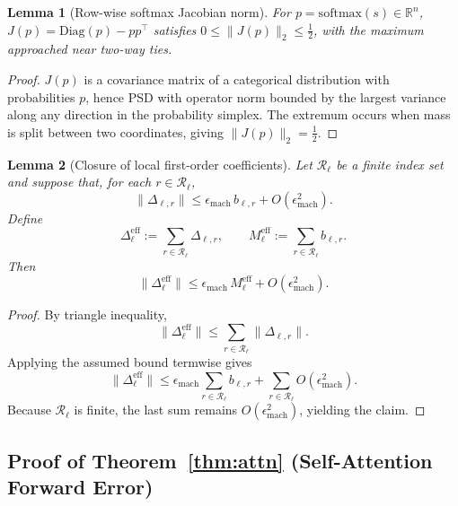 \documentclass[twoside]{article}
\newtheorem{lemma}{Lemma}
\theoremstyle{definition}
\theoremstyle{remark}
\begin{document}
\begin{lemma}[Row-wise softmax Jacobian norm]
\label{lem:softmax-jac}
For $p=\mathrm{softmax}(s)\in\mathbb{R}^n$, $J(p)=\mathrm{Diag}(p)-pp^\top$ satisfies $0\le \|J(p)\|_2\le\tfrac12$, with the maximum approached near two-way ties.
\end{lemma}

\begin{proof}
$J(p)$ is a covariance matrix of a categorical distribution with probabilities $p$, hence PSD with operator norm bounded by the largest variance along any direction in the probability simplex. The extremum occurs when mass is split between two coordinates, giving $\|J(p)\|_2=\tfrac12$.
\end{proof}

\begin{lemma}[Closure of local first-order coefficients]
\label{lem:eff-closure}
Let $\mathcal{R}_\ell$ be a finite index set and suppose that, for each
$r\in\mathcal{R}_\ell$,
\[
\|\Delta_{\ell,r}\|
\le
\epsilon_{\mathrm{mach}}\,b_{\ell,r}
+ O(\epsilon_{\mathrm{mach}}^2).
\]
Define
\[
\Delta^{\mathrm{eff}}_\ell := \sum_{r\in\mathcal{R}_\ell}\Delta_{\ell,r},
\qquad
M^{\mathrm{eff}}_\ell := \sum_{r\in\mathcal{R}_\ell} b_{\ell,r}.
\]
Then
\[
\|\Delta^{\mathrm{eff}}_\ell\|
\le
\epsilon_{\mathrm{mach}}\,M^{\mathrm{eff}}_\ell
+ O(\epsilon_{\mathrm{mach}}^2).
\]
\end{lemma}

\begin{proof}
By triangle inequality,
\[
\|\Delta^{\mathrm{eff}}_\ell\|
\le
\sum_{r\in\mathcal{R}_\ell}
\|\Delta_{\ell,r}\|.
\]
Applying the assumed bound termwise gives
\[
\|\Delta^{\mathrm{eff}}_\ell\|
\le
\epsilon_{\mathrm{mach}}
\sum_{r\in\mathcal{R}_\ell} b_{\ell,r}
+
\sum_{r\in\mathcal{R}_\ell} O(\epsilon_{\mathrm{mach}}^2).
\]
Because $\mathcal{R}_\ell$ is finite, the last sum remains
$O(\epsilon_{\mathrm{mach}}^2)$, yielding the claim.
\end{proof}

\subsection{Proof of Theorem~\ref{thm:attn} (Self-Attention Forward Error)}
\label{app:attn-proof}
\end{document}
